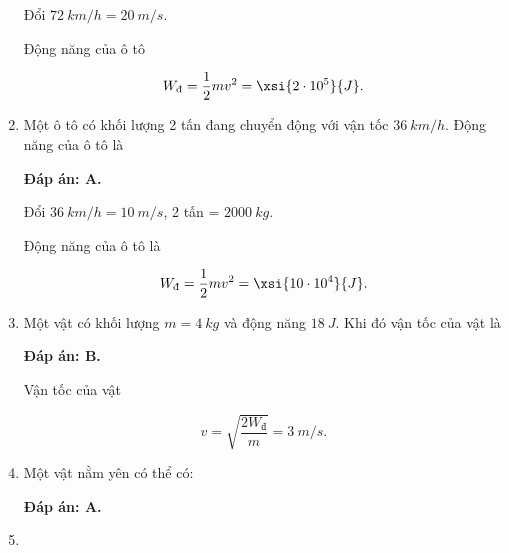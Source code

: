 \begin{enumerate}[label=\bfseries Câu \arabic*:]
{		Đổi $\SI{72}{km/h} = \SI{20}{m/s}.$
		
		Động năng của ô tô
		
		$$W_\text{đ} = \dfrac{1}{2}mv^2 = \xsi{2\cdot 10^5}{J}.$$
	}
	\item {}
	
	
	{
		Một ô tô có khối lượng 2 tấn đang chuyển động với vận tốc $\SI{36}{km/h}$. Động năng của ô tô là
	}
	
	\hideall
	{	
		\textbf{Đáp án: A.}
		
		Đổi $\SI{36}{km/h} = \SI{10}{m/s}$, 2 tấn = $\SI{2000}{kg}.$
		
		Động năng của ô tô là
		
		$$W_\text{đ} = \dfrac{1}{2}mv^2 = \xsi{10\cdot 10^4}{J}.$$
	}
	\item {}
	
	
	{Một vật có khối lượng $m = \SI{4}{kg}$ và động năng $\SI{18}{J}$. Khi đó vận tốc của vật là
	}
	
	\hideall
	{	
		\textbf{Đáp án: B.}
		
		Vận tốc của vật
		
		$$ v = \sqrt{\dfrac{2W_\text{đ}}{m}} = \SI{3}{m/s}.$$ 
	}
		\item {}
	
	
	{Một vật nằm yên có thể có:
	}
	
	\hideall
	{	
		\textbf{Đáp án: A.}
	}
	\item {}
	

\end{enumerate}
